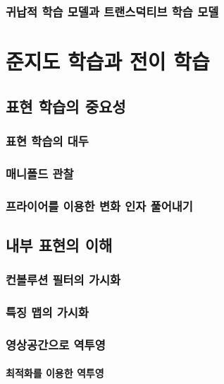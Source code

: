 \documentclass [12pt] {oblivoir}
\let\oldsubsubsection=\subsubsection
\renewcommand{\subsubsection}
{
  \filbreak
  \oldsubsubsection
}
\begin{document}
\subsubsection{귀납적 학습 모델과 트랜스덕티브 학습 모델}

\newpage
\section{준지도 학습과 전이 학습}

\subsection{표현 학습의 중요성}

\subsubsection{표현 학습의 대두}

\subsubsection{매니폴드 관찰}

\subsubsection{프라이어를 이용한 변화 인자 풀어내기}

\subsection{내부 표현의 이해}

\subsubsection{컨볼루션 필터의 가시화}

\subsubsection{특징 맵의 가시화}

\subsubsection{영상공간으로 역투영}

\paragraph*{최적화를 이용한 역투영}\mbox{}
\end{document}
